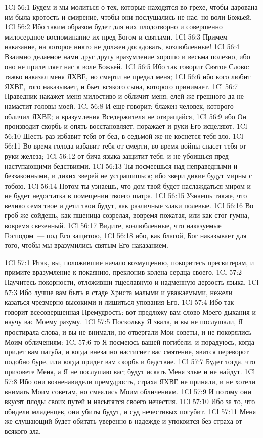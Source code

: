 \vs 1Cl 56:1
Будем и мы молиться о
тех, которые находятся во грехе, чтобы дарована им была кротость и смирение,
чтобы они послушались не нас, но воли Божьей.
\vs 1Cl 56:2
Ибо таким образом будет
для них плодотворно и совершенно милосердное воспоминание их пред Богом и
святыми.
\vs 1Cl 56:3
Примем наказание, на
которое никто не должен досадовать, возлюбленные!
\vs 1Cl 56:4
Взаимно делаемое нами друг
другу вразумление хорошо и весьма полезно, ибо оно не прилепляет нас к воле
Божьей.
\vs 1Cl 56:5
Ибо так говорит Святое
Слово: тяжко наказал меня ЯХВЕ, но смерти не предал меня;
\vs 1Cl 56:6
ибо кого любит ЯХВЕ, того
наказывает, и бьет всякого сына, которого принимает.
\vs 1Cl 56:7
Праведник накажет меня
милостиво и обличит меня; елей же грешного да не намастит головы моей.
\vs 1Cl 56:8
И еще говорит: блажен
человек, которого обличил ЯХВЕ; и вразумления Вседержителя не отвращайся,
\vs 1Cl 56:9
ибо Он производит скорбь и
опять восстановляет, поражает и руки Его исцеляют.
\vs 1Cl 56:10
Шесть раз избавит тебя от
бед, в седьмой же не коснется тебя зло.
\vs 1Cl 56:11
Во время голода избавит
тебя от смерти, во время войны спасет тебя от руки железа;
\vs 1Cl 56:12
от бича языка защитит
тебя, и не убоишься пред наступающими бедствиями.
\vs 1Cl 56:13
Ты посмеешься над
неправедными и беззаконными, и диких зверей не устрашишься; ибо звери дикие
будут мирны с тобою.
\vs 1Cl 56:14
Потом ты узнаешь, что дом
твой будет наслаждаться миром и не будет недостатка в помещении твоего шатра.
\vs 1Cl 56:15
Узнаешь также, что велико
семя твое и дети твои будут, как различные злаки полевые.
\vs 1Cl 56:16
Во гроб же сойдешь, как
пшеница созрелая, вовремя пожатая, или как стог гумна, вовремя свезенный.
\vs 1Cl 56:17
Видите, возлюбленные, что
наказуемые Господом~--- под Его защитою,
\vs 1Cl 56:18
ибо, как благой, Бог
наказывает для того, чтобы мы вразумились святым Его наказанием.

\vs 1Cl 57:1
Итак, вы, положившие
начало возмущению, покоритесь пресвитерам, и примите вразумление к покаянию,
преклонив колена сердца своего.
\vs 1Cl 57:2
Научитесь покорности,
отложивши тщеславную и надменную дерзость языка.
\vs 1Cl 57:3
Ибо лучше вам быть в стаде
Христа малыми и уважаемыми, нежели казаться чрезмерно высокими и лишиться
упования Его.
\vs 1Cl 57:4
Ибо так говорит
всесовершенная Премудрость: вот предложу вам слово Моего дыхания и научу вас
Моему разуму.
\vs 1Cl 57:5
Поскольку Я звала, и вы не
послушали, Я простирала слова, и вы не внимали, но отвергали Мои советы, и не
покорялись Моим обличениям:
\vs 1Cl 57:6
то Я посмеюсь вашей
погибели, и порадуюсь, когда придет вам пагуба, и когда внезапно настигнет вас
смятение, явится переворот подобно буре, или когда придет вам скорбь и
бедствие.
\vs 1Cl 57:7
Будет тогда, что призовете
Меня, а Я не послушаю вас; будут искать Меня злые и не найдут.
\vs 1Cl 57:8
Ибо они возненавидели
премудрость, страха ЯХВЕ не приняли, и не хотели внимать Моим советам, но
смеялись Моим обличениям.
\vs 1Cl 57:9
И потому они вкусят плоды
своих путей и насытятся своего нечестия.
\vs 1Cl 57:10
Ибо за то, что обидели
младенцев, они убиты будут, и суд нечестивых погубит.
\vs 1Cl 57:11
Меня же слушающий будет
обитать уверенно в надежде и упокоится без страха от всякого зла.

